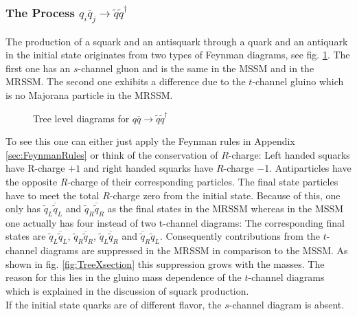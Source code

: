 \subsubsection*{The Process $q_i \overline{q}_j \to \tilde{q}\tilde{q}^\dagger$}
The production of a squark and an antisquark through a quark and an antiquark in the initial state originates from two types of Feynman diagrams, see fig. \ref{fig:squarkantisquark}. The first one has an $s$-channel gluon and is the same in the MSSM and in the MRSSM. The second one exhibits a difference due to the $t$-channel gluino which is no Majorana particle in the MRSSM. 
\begin{figure}[!htbp]
\begin{center}
\caption{Tree level diagrams for $q\overline{q} \to \tilde{q}\tilde{q}^\dagger$}\label{fig:squarkantisquark}
\end{center}
\end{figure}
To see this one can either just apply the Feynman rules in Appendix \ref{sec:FeynmanRules} or think of the conservation of $R$-charge: Left handed squarks have R-charge $+1$ and right handed squarks have $R$-charge $-$1. Antiparticles have the opposite $R$-charge of their corresponding particles. The final state particles have to meet the total $R$-charge zero from the initial state. Because of this, one only has $\tilde{q}_L \overline{\tilde{q}}_L$ and $\tilde{q}_R \overline{\tilde{q}}_R$ as the final states in the MRSSM whereas in the MSSM one actually has four instead of two t-channel diagrams: The corresponding final states are $\tilde{q}_L \overline{\tilde{q}}_L$, $\tilde{q}_R \overline{\tilde{q}}_R$, $\tilde{q}_L \overline{\tilde{q}}_R$ and $\overline{\tilde{q}}_R \tilde{q}_L$. Consequently contributions from the $t$-channel diagrams are suppressed in the MRSSM in comparison to the MSSM. As shown in fig. \ref{fig:TreeXsection} this suppression grows with the masses. The reason for this lies in the gluino mass dependence of the $t$-channel diagrams which is explained in the discussion of squark production.\\
If the initial state quarks are of different flavor, the $s$-channel diagram is absent.

